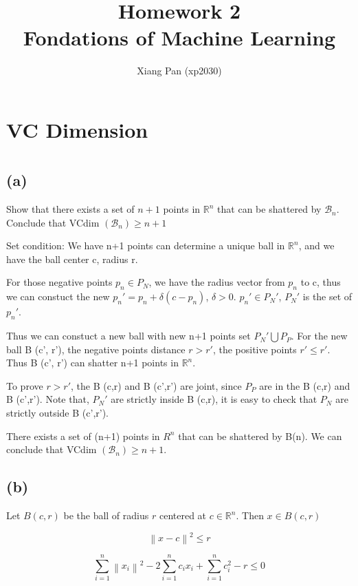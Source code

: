 \documentclass{article}
\title{%
   Homework 2 \\
  \large Fondations of Machine Learning \\}
\author{Xiang Pan (xp2030)}
\begin{document}
\maketitle
\section*{VC Dimension}
\section{}
\subsection*{(a)}
Show that there exists a set of $n+1$ points in $\mathbb{R}^{n}$ that can be shattered by $\mathcal{B}_{n}$. Conclude that VCdim $\left(\mathcal{B}_{n}\right) \geq n+1$


Set condition: We have n+1 points can determine a unique ball in $\mathbb{R}^{n}$, and we have the ball center c, radius r.

For those negative points $p_n \in P_{N}$, we have the radius vector from $p_n$ to c, thus we can constuct the new $p_n' = p_n + \delta(c-p_n)$, $\delta>0$. $p_n' \in P_N'$, $P_N'$ is the set of $p_n'$.

 Thus we can constuct a new ball with new n+1 points set ${P_N'} \bigcup {P_P}$. For the new ball B (c', r'), the negative points distance $r>r'$, the positive points $r'\leq r'$. Thus B (c', r') can shatter n+1 points in $\mathbb{R}^{n}$.

To prove $r > r'$, the B (c,r) and B (c',r') are joint, since $P_P$ are in the B (c,r) and B (c',r'). Note that, $P_N'$ are strictly inside B (c,r), it is easy to check that $P_N$ are strictly outside B (c',r').

There exists a set of (n+1) points in $R^n$ that can be shattered by B(n). We can conclude that VCdim $\left(\mathcal{B}_{n}\right) \geq n+1$.

\subsection*{(b)}

Let $B(c, r)$ be the ball of radius $r$ centered at $c \in \mathbb{R}^{n}$. Then $x \in B(c, r)$

\begin{equation}
    \left\| x - c \right\|^2 \leq r
\end{equation}


\begin{equation}
    \sum_{i=1}^{n}\left\|x_{i}\right\|^{2}-2 \sum_{i=1}^{n} c_{i} x_{i}+\sum_{i=1}^{n} c_{i}^{2}-r \leq 0
\end{equation}
\end{document}
